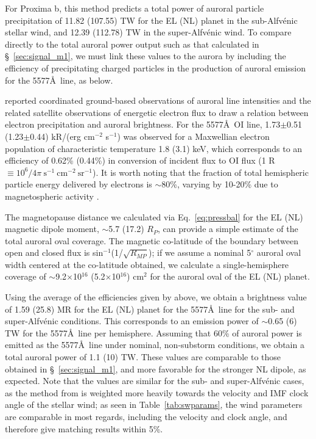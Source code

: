 \documentclass[apjl]{emulateapj}
\begin{document}
For Proxima b, this method predicts a total power of auroral particle precipitation of 11.82 (107.55) TW for the EL (NL) planet in the sub-Alfv\'{e}nic stellar wind, and 12.39 (112.78) TW in the super-Alfv\'{e}nic wind. To compare directly to the total auroral power output such as that calculated in \S~\ref{sec:signal_m1}, we must link these values to the aurora by including the efficiency of precipitating charged particles in the production of auroral emission for the 5577\AA\ line, as below.

\citet{Steele1990} reported coordinated ground-based observations of auroral line intensities and the related satellite observations of energetic electron flux to draw a relation between electron precipitation and auroral brightness. For the 5577\AA\ OI line, 1.73$\pm$0.51 (1.23$\pm$0.44) kR/(erg cm$^{-2}$ s$^{-1}$) was observed for a Maxwellian electron population of characteristic temperature 1.8 (3.1) keV, which corresponds to an efficiency of 0.62\% (0.44\%) in conversion of incident flux to OI flux (1 R $\equiv 10^{6}/4\pi\ \mathrm{s^{-1}\ cm^{-2}\ sr^{-1}}$). It is worth noting that the fraction of total hemispheric particle energy delivered by electrons is $\sim$80\%, varying by 10-20\% due to magnetospheric activity \citep{Hubert2002}.

The magnetopause distance we calculated via Eq.~\ref{eq:pressbal} for the EL (NL) magnetic dipole moment, $\sim$5.7 (17.2) $R_P$, can provide a simple estimate of the total auroral oval coverage. The magnetic co-latitude of the boundary between open and closed flux is sin$^{-1}$(1/$\sqrt{R_{MP}}$); if we assume a nominal 5$^\circ$ auroral oval width centered at the co-latitude obtained, we calculate a single-hemisphere coverage of $\sim$9.2$\times$10$^{16}$ (5.2$\times$10$^{16}$) cm$^2$ for the auroral oval of the EL (NL) planet.
 
 Using the average of the efficiencies given by \citet{Steele1990} above, we obtain a brightness value of 1.59 (25.8) MR for the EL (NL) planet for the 5577\AA\ line for the sub- and super-Alfv\'{e}nic conditions. This corresponds to an emission power of $\sim$0.65 (6) TW for the 5577\AA\ line per hemisphere. Assuming that 60\% of auroral power is emitted as the 5577\AA\ line under nominal, non-substorm conditions, we obtain a total auroral power of 1.1 (10) TW. These values are comparable to those obtained in \S~\ref{sec:signal_m1}, and more favorable for the stronger NL dipole, as expected. Note that the values are similar for the sub- and super-Alfv\'{e}nic cases, as the method from \citet{Wang2014} is weighted more heavily towards the velocity and IMF clock angle of the stellar wind; as seen in Table~\ref{tab:swparams}, the wind parameters are comparable in most regards, including the velocity and clock angle, and therefore give matching results within 5\%.
\end{document}

